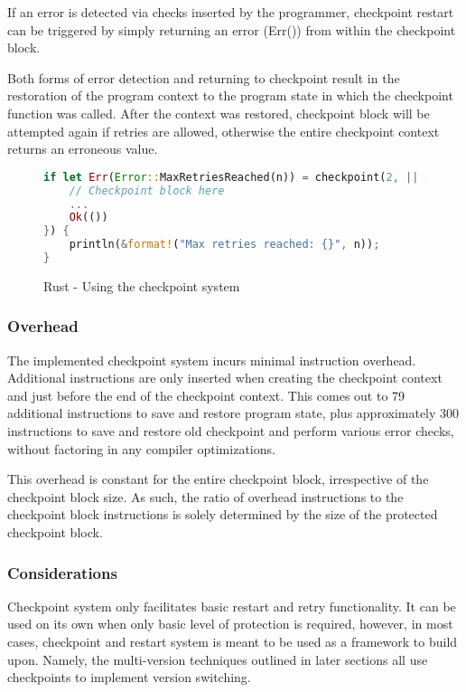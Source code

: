 If an error is detected via checks inserted by the programmer, checkpoint restart can be triggered by simply returning an error (Err()) from within the checkpoint block.

Both forms of error detection and returning to checkpoint result in the restoration of the program context to the program state in which the checkpoint function was called. After the context was restored, checkpoint block will be attempted again if retries are allowed, otherwise the entire checkpoint context returns an erroneous value.

\begin{figure}[!h]
\begin{lstlisting}[language=Rust]
if let Err(Error::MaxRetriesReached(n)) = checkpoint(2, || {
    // Checkpoint block here
    ...
    Ok(())
}) {
    println(&format!("Max retries reached: {}", n));
}
\end{lstlisting}
\caption{Rust - Using the checkpoint system}
\label{fig:rust_using_checkpoint}
\end{figure}

\subsubsection{Overhead}

The implemented checkpoint system incurs minimal instruction overhead. Additional instructions are only inserted when creating the checkpoint context and just before the end of the checkpoint context. This comes out to 79 additional instructions to save and restore program state, plus approximately 300 instructions to save and restore old checkpoint and perform various error checks, without factoring in any compiler optimizations.

This overhead is constant for the entire checkpoint block, irrespective of the checkpoint block size. As such, the ratio of overhead instructions to the checkpoint block instructions is solely determined by the size of the protected checkpoint block.

\subsubsection{Considerations} \label{sec:checkpoint_considerations}

Checkpoint system only facilitates basic restart and retry functionality. It can be used on its own when only basic level of protection is required, however, in most cases, checkpoint and restart system is meant to be used as a framework to build upon. Namely, the multi-version techniques outlined in later sections all use checkpoints to implement version switching.

